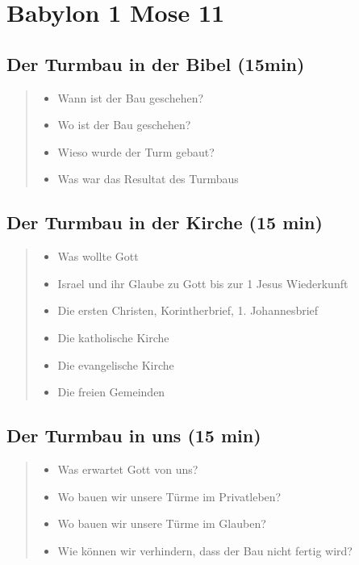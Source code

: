 \documentclass[12pt]{../../inc/mybib}
\author{Lothar Schmid}
\begin{document}
\section{Babylon 1 Mose 11}

\subsection{Der Turmbau in der Bibel (15min)}

\begin{quote}
    \begin{itemize}
        \item Wann ist der Bau geschehen?
        \item Wo ist der Bau geschehen?
        \item Wieso wurde der Turm gebaut?
        \item Was war das Resultat des Turmbaus
    \end{itemize}
\end{quote}
\subsection{Der Turmbau in der Kirche (15 min)}
\begin{quote}
    \begin{itemize}
        \item Was wollte Gott
        \item Israel und ihr Glaube zu Gott bis zur 1 Jesus Wiederkunft
        \item Die ersten Christen, Korintherbrief, 1. Johannesbrief
        \item Die katholische Kirche
        \item Die evangelische Kirche
        \item Die freien Gemeinden
    \end{itemize}
\end{quote}

\subsection{Der Turmbau in uns (15 min)}
\begin{quote}
\begin{itemize}
    \item Was erwartet Gott von uns?
    \item Wo bauen wir unsere Türme im Privatleben?
    \item Wo bauen wir unsere Türme im Glauben?
    \item Wie können wir verhindern, dass der Bau nicht fertig wird?    
\end{itemize}
    
\end{quote}
\end{document}
